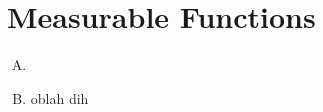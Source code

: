 \chapter{Measurable Functions}
\label{chapter:measurable-function}

\begin{enumerate}[A.]
  \item 
  \item oblah dih
\end{enumerate}
